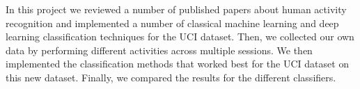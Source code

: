 In this project we reviewed a number of published papers about human activity recognition and implemented a number of classical machine learning and deep learning classification techniques for the UCI dataset.
Then, we collected our own data by performing different activities across multiple sessions. We then implemented the classification methods that worked best for the UCI dataset \cite{Anguita2013} on this new dataset.
Finally, we compared the results for the different classifiers.